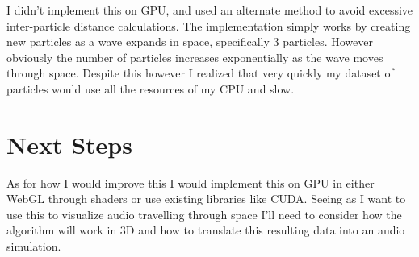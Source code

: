 \documentclass[11pt]{article}
\begin{document}
I didn't implement this on GPU, and used an alternate method to avoid excessive inter-particle distance calculations. 
The implementation simply works by creating new particles as a wave expands in space, specifically 3 particles. However obviously the number of particles increases exponentially as the wave moves through space.
Despite this however I realized that very quickly my dataset of particles would use all the resources of my CPU and slow. 

\section{Next Steps}
As for how I would improve this I would implement this on GPU in either WebGL through shaders or use existing libraries like CUDA.
Seeing as I want to use this to visualize audio travelling through space I'll need to consider how the algorithm will work in 3D and how to translate this resulting data into an audio simulation.
\end{document}
